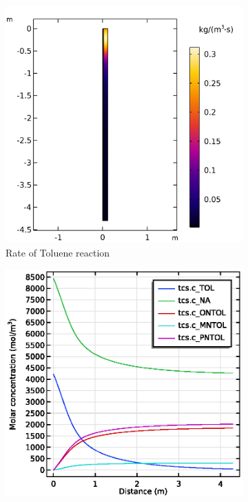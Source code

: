 \begin{figure}[p]
    
    \begin{minipage}{\linewidth}
        \centering
        \begin{subfigure}{0.42\linewidth}
            \includegraphics[width=\linewidth, scale=0.5]{figures/r_TOL.png}
            \caption{Rate of Toluene reaction}
            \label{fig:comsol-performance:r_TOL}
        \end{subfigure}\hspace{\floatsep}
        \begin{subfigure}{0.42\linewidth}
            \includegraphics[width=\linewidth, scale=0.5]{figures/concentration.eps}

\end{subfigure}
\end{minipage}
\end{figure}
